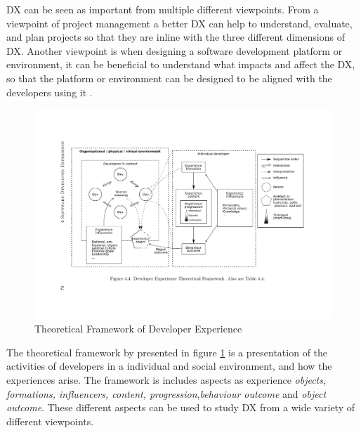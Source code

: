 \documentclass[english, 12pt, a4paper, sci, utf8, a-1b, online]{aaltothesis}
\begin{document}
DX can be seen as important from multiple different viewpoints. From a viewpoint of project management a better DX can help to understand, evaluate, and plan projects so that they are inline with the three different dimensions of DX. Another viewpoint is when designing a software development platform or environment, it can be beneficial to understand what impacts and affect the DX, so that the platform or environment can be designed to be aligned with the developers using it \parencite{fagerholm-dx-concept-and-definition}.


\begin{figure}
  \captionsetup{width=0.6\textwidth}
  \caption{Theoretical Framework of Developer Experience \parencite{fagerholm-doctoral-thesis}}
  \begin{center}
    \includegraphics[width=\textwidth]{theoretical-framework.pdf}
  \end{center}
  \label{figure:theoretical-framework}
\end{figure}

The theoretical framework by \textcite{fagerholm-doctoral-thesis} presented in figure \ref{figure:theoretical-framework} is a presentation of the activities of developers in a individual and social environment, and how the experiences arise. The framework is includes aspects as experience \textit{objects, formations, influencers, content, progression},\textit{behaviour outcome} and \textit{object outcome}. These different aspects can be used to study DX from a wide variety of different viewpoints.
\end{document}
